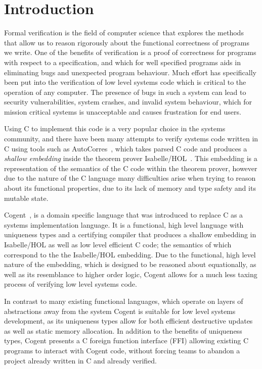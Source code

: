 \chapter{Introduction}\label{ch:intro}

Formal verification is the field of computer science that explores the methods that allow us to
  reason rigorously about the functional correctness of programs we write.
One of the benefits of verification is a proof of correctness for programs with respect to a specification,
  and which for well specified programs aids in eliminating bugs and unexpected program behaviour.
Much effort has specifically been put into the verification of low level systems code
  which is critical to the operation of any computer.
The presence of bugs in such a system can lead to security vulnerabilities,
  system crashes, and invalid system behaviour, which for mission critical systems is unacceptable and
  causes frustration for end users.

Using C to implement this code is a very popular choice in the systems community,
  and there have been many attempts to verify systems code written in C using tools such as 
  AutoCorres~\citep{AutoCorres}, which takes parsed C code and produces a \textit{shallow embedding}
  inside the theorem prover Isabelle/HOL~\citep{IsabelleTutorial}.
This embedding is a representation of the semantics of the C code within the theorem prover,
  however due to the nature of the C language many difficulties arise when trying to
  reason about its functional properties, due to its lack of memory and type safety 
  and its mutable state.

Cogent~\citep{ICFPCogent}, is a domain specific language that was introduced to replace C as a systems
  implementation language.
It is a functional, high level language with uniqueness types and a certifying compiler
  that produces a shallow embedding in Isabelle/HOL as well as low level efficient C code;
  the semantics of which correspond to the the Isabelle/HOL embedding.
Due to the functional, high level nature of the embedding,
  which is designed to be reasoned about equationally, as well as its resemblance to higher order logic,
  Cogent allows for a much less taxing process of verifying low level systems code.

In contrast to many existing functional languages, which operate
  on layers of abstractions away from the system Cogent is suitable for low level systems development,
  as its uniqueness types allow for both efficient destructive updates as well as static memory allocation.
In addition to the benefits of uniqueness types, Cogent presents a C foreign function interface (FFI) allowing existing C programs
 to interact with Cogent code, without forcing teams to abandon a project already written in C and already verified.

